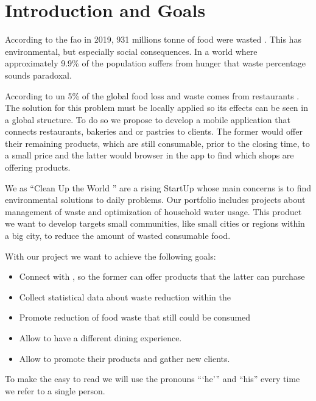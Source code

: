 \section{Introduction and Goals}

According to the \acrfull{fao} in 2019, 931 millions tonne of food were wasted \cite{refart:FAOFW}. This has
environmental, but especially social consequences. In a world where approximately 9.9\% of the \cite{refart:AAHWH}
population suffers from hunger that waste percentage sounds paradoxal.

According to \acrfull{un} 5\% of the global food loss and waste comes from restaurants \cite{refart:UNSP}. 
The solution for this problem must be locally applied so its effects can be seen in a global structure. To do 
so we propose to develop a mobile application that connects restaurants, bakeries and or pastries to clients. The
former would offer their remaining products, which are still consumable, prior to the closing time, to a small price
and the latter would browser in the app to find which shops are offering products. 

We as ``Clean Up the World \textregistered'' are a rising StartUp whose main concerns is to find environmental solutions to
daily problems. Our portfolio includes projects about management of waste and optimization of household water 
usage. This product we want to develop targets small communities, like small cities or regions within a big city, 
to reduce the amount of wasted consumable food.

With our project we want to achieve the following goals:

\begin{itemize}
    \item Connect  with , so the former can offer products that the latter
    can purchase
    \item Collect statistical data about waste reduction within the 
    \item Promote reduction of food waste that still could be consumed
    \item Allow  to have a different dining experience.
    \item Allow  to promote their products and gather new clients.
\end{itemize}

To make the easy to read we will use the pronouns ```he''' and ``his'' every time we refer to a single person.

